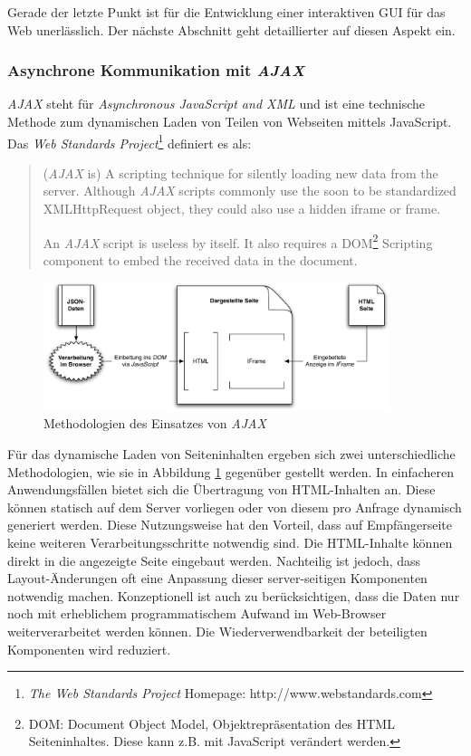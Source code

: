Gerade der letzte Punkt ist für die Entwicklung einer interaktiven GUI für das Web unerlässlich. Der nächste Abschnitt geht detaillierter auf diesen Aspekt ein.

\newpage
\subsubsection{Asynchrone Kommunikation mit \emph{AJAX}}\label{sec:AJAX}

\emph{AJAX} steht für \emph{Asynchronous JavaScript and XML} und ist eine technische Methode zum dynamischen Laden von Teilen von Webseiten mittels JavaScript. Das \emph{Web Standards Project}\footnote{\emph{The Web Standards Project} Homepage: http://www.webstandards.com} definiert es als:

\begin{quote}
	(\emph{AJAX} is) A scripting technique for silently loading new data from the server. Although \emph{AJAX} scripts commonly use the soon to be standardized XMLHttpRequest object, they could also use a hidden iframe or frame.
		
	An \emph{AJAX} script is useless by itself. It also requires a DOM\footnote{DOM: Document Object Model, Objektrepräsentation des HTML Seiteninhaltes. Diese kann z.B. mit JavaScript verändert werden.} Scripting component to embed the received data in the document.
\end{quote} 

\begin{figure}[H]
	\centering
	\includegraphics*[width=0.9\textwidth]{figures/DA/AJAX_Methodologien.pdf}
	\caption{Methodologien des Einsatzes von \emph{AJAX}}\label{fig:AJAX.Methodologien}
\end{figure}

Für das dynamische Laden von Seiteninhalten ergeben sich zwei unterschiedliche Methodologien, wie sie in Abbildung \ref{fig:AJAX.Methodologien} gegenüber gestellt werden. In einfacheren Anwendungsfällen bietet sich die Übertragung von HTML-Inhalten an. Diese können statisch auf dem Server vorliegen oder von diesem pro Anfrage dynamisch generiert werden. Diese Nutzungsweise hat den Vorteil, dass auf Empfängerseite keine weiteren Verarbeitungsschritte notwendig sind. Die HTML-Inhalte können direkt in die angezeigte Seite eingebaut werden. Nachteilig ist jedoch, dass Layout-Änderungen oft eine Anpassung dieser server-seitigen Komponenten notwendig machen. Konzeptionell ist auch zu berücksichtigen, dass die Daten nur noch mit erheblichem programmatischem Aufwand im Web-Browser weiterverarbeitet werden können. Die Wiederverwendbarkeit der beteiligten Komponenten wird reduziert.

